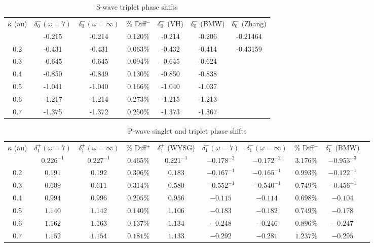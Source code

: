 \documentclass[preprint,showpacs,preprintnumbers,amsmath,amssymb]{revtex4}
\begin{document}
\begin{table}[H]
\centering
\begin{ruledtabular}
\begin{tabular}{c c c c c c c}
$\kappa$ (au) & $\delta_0^- (\omega = 7)$ & $\delta_0^- (\omega = \infty)$ & \% Diff$^-$ & $\delta_0^-$ (VH) & $\delta_0^-$ (BMW) & $\delta_0^-$ (Zhang) \\
\colrule
0.1 & -0.215 & -0.214 & 0.120\% & -0.214 & -0.206 & -0.21464 \\
0.2 & -0.431 & -0.431 & 0.063\% & -0.432 & -0.414 & -0.43159 \\
0.3 & -0.645 & -0.645 & 0.094\% & -0.645 & -0.624 & \\
0.4 & -0.850 & -0.849 & 0.130\% & -0.850 & -0.838 & \\
0.5 & -1.041 & -1.040 & 0.166\% & -1.040 & -1.037 & \\
0.6 & -1.217 & -1.214 & 0.273\% & -1.215 & -1.213 & \\
0.7 & -1.375 & -1.372 & 0.250\% & -1.373 & -1.367 & \\
\end{tabular}
\end{ruledtabular}
\caption{S-wave triplet phase shifts}
\label{tab:SWaveTripletPhase}
\end{table}


\begin{table}[H]
\begin{center}
\begin{ruledtabular}
\begin{tabular}{c c c c c c c c c c}
$\kappa$ (au) & $\delta_1^+ (\omega = 7)$ & $\delta_1^+ (\omega = \infty)$ & \% Diff$^+$ & $\delta_1^+$ (WYSG) & $\delta_1^- (\omega = 7)$ & $\delta_1^- (\omega = \infty)$ & \% Diff$^-$ & $\delta_1^-$ (BMW) \\
\colrule
0.1 & $0.226^{-1}$ & $0.227^{-1}$ & $0.465\%$ & $0.221^{-1}$ & $-0.178^{-2}$ & $-0.172^{-2}$ & $3.176\%$ & $-0.953^{-3}$ \\
0.2 & $0.191$      & $0.192$      & $0.306\%$ & $0.183$      & $-0.167^{-1}$ & $-0.165^{-1}$ & $0.993\%$ & $-0.122^{-1}$ \\
0.3 & $0.609$      & $0.611$      & $0.314\%$ & $0.580$      & $-0.552^{-1}$ & $-0.540^{-1}$ & $0.749\%$ & $-0.456^{-1}$ \\
0.4 & $0.994$      & $0.996$      & $0.205\%$ & $0.956$      & $-0.115$      & $-0.114$      & $0.698\%$ & $-0.104$ \\
0.5 & $1.140$      & $1.142$      & $0.140\%$ & $1.106$      & $-0.183$      & $-0.182$      & $0.749\%$ & $-0.178$ \\
0.6 & $1.162$      & $1.163$      & $0.137\%$ & $1.134$      & $-0.248$      & $-0.246$      & $0.896\%$ & $-0.247$ \\
0.7 & $1.152$      & $1.154$      & $0.181\%$ & $1.133$      & $-0.292$      & $-0.281$      & $1.237\%$ & $-0.295$ \\
\end{tabular}
\end{ruledtabular}
\caption{P-wave singlet and triplet phase shifts}
\label{tab:PWavePhase}
\end{center}
\end{table}
\end{document}
